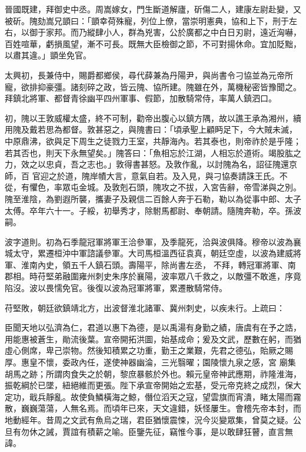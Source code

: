 \begin{pinyinscope}
 晉國既建，拜御史中丞。周嵩嫁女，門生斷道解廬，斫傷二人，建康左尉赴變，又被斫。隗劾嵩兄顗曰：「顗幸荷殊寵，列位上僚，當崇明憲典，協和上下，刑于左右，以御于家邦。而乃縱肆小人，群為兇害，公於廣都之中白日刃尉，遠近洶嚇，百姓喧華，虧損風望，漸不可長。既無大臣檢御之節，不可對揚休命。宜加貶黜，以肅其違。」顗坐免官。



 太興初，長兼侍中，賜爵都鄉侯，尋代薛兼為丹陽尹，與尚書令刁協並為元帝所
 寵，欲排抑豪彊。諸刻碎之政，皆云隗、協所建。隗雖在外，萬機秘密皆豫聞之。拜鎮北將軍、都督青徐幽平四州軍事、假節，加散騎常侍，率萬人鎮泗口。



 初，隗以王敦威權太盛，終不可制，勸帝出腹心以鎮方隅，故以譙王承為湘州，續用隗及戴若思為都督。敦甚惡之，與隗書曰：「頃承聖上顧眄足下，今大賊未滅，中原鼎沸，欲與足下周生之徒戮力王室，共靜海內。若其泰也，則帝祚於是乎隆；若其否也，則天下永無望矣。」隗答曰：「魚相忘於江湖，人相忘於道術。竭股肱之力，效之以忠貞，吾之志也。」敦得書甚怒。及敦作亂，以討隗為名，詔征隗還京師，百
 官迎之於道，隗岸幘大言，意氣自若。及入見，與刁協奏請誅王氏。不從，有懼色，率眾屯金城。及敦剋石頭，隗攻之不拔，入宮告辭，帝雪涕與之別。隗至淮陰，為劉遐所襲，攜妻子及親信二百餘人奔于石勒，勒以為從事中郎、太子太傅。卒年六十一。子綏，初舉秀才，除駙馬都尉、奉朝請。隨隗奔勒，卒。孫波嗣。



 波字道則。初為石季龍冠軍將軍王洽參軍，及季龍死，洽與波俱降。穆帝以波為襄城太守，累遷桓沖中軍諮議參軍。大司馬桓溫西征袁真，朝廷空虛，以波為建威將軍、淮南內史，領五千人鎮石頭。壽陽平，除尚書左丞，
 不拜，轉冠軍將軍、南郡相。時苻堅弟融圍雍州刺史朱序於襄陽，波率眾八千救之，以敵彊不敢進，序竟陷沒。波以畏懦免官。後復以波為冠軍將軍，累遷散騎常侍。



 苻堅敗，朝廷欲鎮靖北方，出波督淮北諸軍、冀州刺史，以疾未行。上疏曰：



 臣聞天地以弘濟為仁，君道以惠下為德，是以禹湯有身勤之績，唐虞有在予之誥，用能惠被蒼生，勛流後葉。宣帝開拓洪圖，始基成命；爰及文武，歷數在躬，而猶虛心側席，卑己崇物。然後知積累之功重，勤王之業艱，先君之德弘，貽厥之賜厚。惠皇不懷，委政內任，遂使神器幽淪，三光翳曜；園陵懷九泉之感，宮
 廟集胡馬之跡；所謂肉食失之於朝，黎庶暴骸於外也。賴元皇帝神武應期，祚隆淮海，振乾綱於已墜，紐絕維而更張。陛下承宣帝開始之宏基，受元帝克終之成烈，保大定功，戢兵靜亂。故使負鱗橫海之鯨，僭位滔天之寇，望雲旗而宵潰，睹太陽而霧散，巍巍蕩蕩，人無名焉。而頃年已來，天文違錯，妖怪屢生。會稽先帝本封，而地動經年。昔周之文武有魚烏之瑞，君臣猶懷震悚，況今災變眾集，曾莫之疑。公旦有勿休之誡，賈誼有積薪之喻。臣鑒先征，竊惟今事，是以敢肆狂瞽，直言無諱。




\end{pinyinscope}
